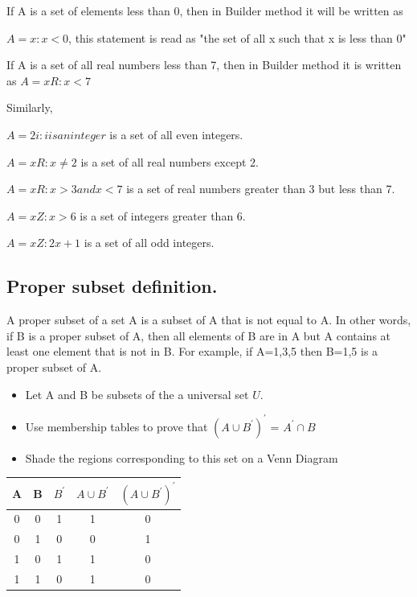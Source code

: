 \documentclass[]{report}
\begin{document}
\begin{enumerate}
If A is a set of elements less than 0, then in Builder method it will be written as

$A = {x: x < 0}$, this statement is read as "the set of all x such that x is less than 0"

If A is a set of all real numbers less than 7, then in Builder method it is written as $A = {x   R: x < 7}$

Similarly,

$A = {2i: i is an integer}$ is a set of all even integers.

$A = {x   R: x \neq 2}$ is a set of all real numbers except 2.

$A = {x   R: x > 3 and x < 7}$ is a set of real numbers greater than 3 but less than 7.

$A = {x   Z: x > 6}$ is a set of integers greater than 6.

$A = {x   Z: 2x + 1}$ is a set of all odd integers.


\subsection{Proper subset definition.} 
A proper subset of a set A is a subset of A that is not equal to A. In other words, if B is a proper subset of A, then all elements of B are in A but A contains at least one element that is not in B. For example, if A={1,3,5} then B={1,5} is a proper subset of A.







\begin{itemize}
\item Let A and B be subsets of the a universal set $U$.
\item Use membership tables to prove that $(A \cup B^{\prime})^{\prime}$ = $A^{\prime} \cap B$
\item Shade the regions corresponding to this set on a Venn Diagram
\end{itemize}

\begin{tabular}{|c|c|| c | c| c|}
A&B&$B^{\prime}$&$A \cup B^{\prime}$&$(A \cup B^{\prime})^{\prime}$\\ \hline
0&0&1&1&0\\
0&1&0&0&1\\
1&0&1&1&0\\
1&1&0&1&0\\
\end{tabular}


\end{enumerate}
\end{document}
